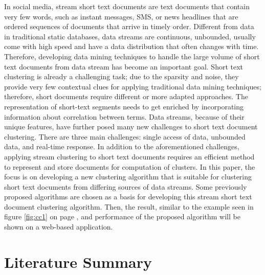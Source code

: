 \documentclass{IEEEtran}
\begin{document}
In social media, stream short text documents are text documents that contain very few words, such as instant messages, SMS, or news headlines that are ordered sequences of documents that arrive in timely order. Different from data in traditional static databases, data streams are continuous, unbounded, usually come with high speed and have a data distribution that often changes with time. Therefore, developing data mining techniques to handle the large volume of short text documents from data stream has become an important goal. Short text clustering is already a challenging task; due to the sparsity and noise, they provide very few contextual clues for applying traditional data mining techniques; therefore, short documents require different or more adapted approaches. The representation of short-text segments needs to get enriched by incorporating information about correlation between terms. Data streams, because of their unique features, have further posed many new challenges to short text document clustering. There are three main challenges: single access of data, unbounded data, and real-time response. 
In addition to the aforementioned challenges, applying stream clustering to short text documents requires an efficient method to represent and store documents for computation of clusters. In this paper, the focus is on developing a new clustering algorithm that is suitable for clustering short text documents from differing sources of data streams. Some previously proposed algorithms are chosen as a basis for developing this stream short text document clustering algorithm. Then, the result, similar to the example seen in figure \ref{fig:cc1} on page \pageref{fig:cc1}, and performance of the proposed algorithm will be shown on a web-based application.

\section{Literature Summary}

\newcommand{\columnheaddisplaystyle}[1]{%
  \textbf{#1}%
}

\makeatletter
\newcommand{\labelthis}[2]{%
  \columnheaddisplaystyle{#2}%
  \immediate\write\@auxout{%
    \string\newlabel{#1}{{}{}{#2}{}}
  }%
}
\end{document}
